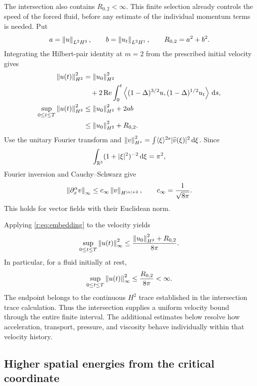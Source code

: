 The intersection also contains \(R_{0,2}<\infty\). This finite selection
already controls the speed of the forced fluid, before any estimate of
the individual momentum terms is needed. Put
\[
 a=\left\lVert u\right\rVert_{L^2H^3},\qquad
 b=\left\lVert u_t\right\rVert_{L^2H^1},\qquad R_{0,2}=a^2+b^2.
\]
Integrating the Hilbert-pair identity at \(m=2\) from the prescribed
initial velocity gives
\begin{equation}
 \begin{aligned}
 \left\lVert u(t)\right\rVert_{H^2}^2
 &=\left\lVert u_0\right\rVert_{H^2}^2\\
 &\quad+2\operatorname{Re}\int_0^t
 \left\langle (1-\Delta)^{3/2}u,(1-\Delta)^{1/2}u_t\right\rangle\,\mathrm d s,\\
 \sup_{0\le t\le T}\left\lVert u(t)\right\rVert_{H^2}^2
 &\le\left\lVert u_0\right\rVert_{H^2}^2+2ab\\
 &\le\left\lVert u_0\right\rVert_{H^2}^2+R_{0,2}.
 \end{aligned}
 \label{r:eq:velocity-H2}
\end{equation}
Use the unitary Fourier transform and
\(\left\lVert v\right\rVert_{H^s}^2=\int\langle\xi\rangle^{2s}|\widehat v(\xi)|^2\,\mathrm d\xi\).
Since
\[
 \int_{\mathbb R^3}(1+|\xi|^2)^{-2}\,\mathrm d\xi=\pi^2,
\]
Fourier inversion and Cauchy--Schwarz give
\begin{equation}
 \left\lVert \partial_x^\alpha v\right\rVert_\infty
 \le c_\infty\left\lVert v\right\rVert_{H^{|\alpha|+2}},
 \qquad c_\infty=\frac1{\sqrt{8\pi}}.
 \label{r:eq:embedding}
\end{equation}
This holds for vector fields with their Euclidean norm.

Applying \eqref{r:eq:embedding} to the velocity yields
\begin{equation}
 \sup_{0\le t\le T}\left\lVert u(t)\right\rVert_\infty^2
 \le\frac{\left\lVert u_0\right\rVert_{H^2}^2+R_{0,2}}{8\pi}.
 \label{r:eq:velocity-bound}
\end{equation}
In particular, for a fluid initially at rest,
\[
 \sup_{0\le t\le T}\left\lVert u(t)\right\rVert_\infty^2
 \le\frac{R_{0,2}}{8\pi}<\infty.
\]
The endpoint belongs to the continuous \(H^2\) trace established in the intersection trace calculation. Thus the intersection supplies a uniform velocity bound
through the entire finite interval. The additional estimates below
resolve how acceleration, transport, pressure, and viscosity behave
individually within that velocity history.


\subsection{Higher spatial energies from the critical coordinate}
\label{r:sec:higher-spatial-source}

